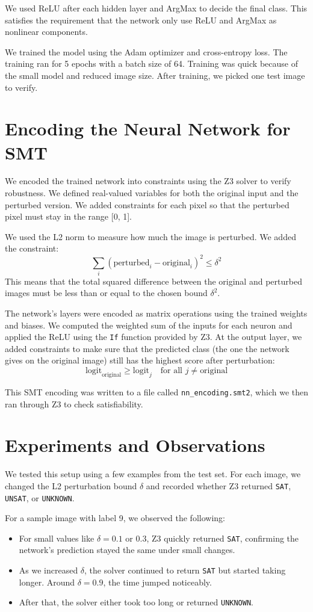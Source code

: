 \documentclass{article}
\begin{document}
We used ReLU after each hidden layer and ArgMax to decide the final class. This satisfies the requirement that the network only use ReLU and ArgMax as nonlinear components.

We trained the model using the Adam optimizer and cross-entropy loss. The training ran for 5 epochs with a batch size of 64. Training was quick because of the small model and reduced image size. After training, we picked one test image to verify.

\section{Encoding the Neural Network for SMT}
We encoded the trained network into constraints using the Z3 solver to verify robustness. We defined real-valued variables for both the original input and the perturbed version. We added constraints for each pixel so that the perturbed pixel must stay in the range [0, 1].

We used the L2 norm to measure how much the image is perturbed. We added the constraint:
\[
\sum_i (\text{perturbed}_i - \text{original}_i)^2 \leq \delta^2
\]
This means that the total squared difference between the original and perturbed images must be less than or equal to the chosen bound $\delta^2$.

The network's layers were encoded as matrix operations using the trained weights and biases. We computed the weighted sum of the inputs for each neuron and applied the ReLU using the \texttt{If} function provided by Z3. At the output layer, we added constraints to make sure that the predicted class (the one the network gives on the original image) still has the highest score after perturbation:
\[
\text{logit}_{\text{original}} \geq \text{logit}_j \quad \text{for all } j \neq \text{original}
\]

This SMT encoding was written to a file called \texttt{nn\_encoding.smt2}, which we then ran through Z3 to check satisfiability.

\section{Experiments and Observations}
We tested this setup using a few examples from the test set. For each image, we changed the L2 perturbation bound $\delta$ and recorded whether Z3 returned \texttt{SAT}, \texttt{UNSAT}, or \texttt{UNKNOWN}.

For a sample image with label 9, we observed the following:
\begin{itemize}
    \item For small values like $\delta = 0.1$ or $0.3$, Z3 quickly returned \texttt{SAT}, confirming the network's prediction stayed the same under small changes.
    \item As we increased $\delta$, the solver continued to return \texttt{SAT} but started taking longer. Around $\delta = 0.9$, the time jumped noticeably.
    \item After that, the solver either took too long or returned \texttt{UNKNOWN}.
\end{itemize}
\end{document}
